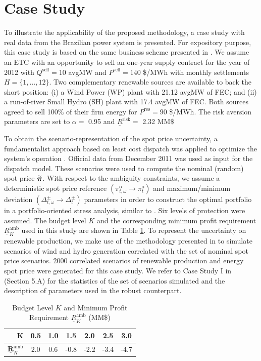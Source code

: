 \section{Case Study}
\label{CaseStudy}

	To illustrate the applicability of the proposed methodology, a case study with real data from the Brazilian power system is presented. For expository purpose, this case study is based on the same business scheme presented in \cite{RobustSpotPrice}. We assume an ETC with an opportunity to sell an one-year supply contract for the year of 2012 with $Q^{\text{sell}} = 10$ avgMW and $P^{\text{sell}} = 140$ \$/MWh with monthly settlements $H = \{1, \dots, 12\}$. Two complementary renewable sources are available to back the short position: (i) a Wind Power (WP) plant with 21.12 avgMW of FEC; and (ii) a run-of-river Small Hydro (SH) plant with 17.4 avgMW of FEC. Both sources agreed to sell 100\% of their firm energy for $P^{\text{res}} = 90$ \$/MWh. The risk aversion parameters are set to $\alpha = $ 0.95 and $\underline{R}^{\text{risk}} = $ 2.32 MM\$

	To obtain the scenario-representation of the spot price uncertainty, a fundamentalist approach based on least cost dispatch was applied to optimize the system's operation \cite{SDDPMathProg}. Official data from December 2011 was used as input for the dispatch model. These scenarios were used to compute the nominal (random) spot price $\accentset{\sim}{\boldsymbol{\pi}}$. With respect to the ambiguity constraints, we assume a deterministic spot price reference $(\pi^{\text{o}}_{t,\omega} \rightarrow \pi^{\text{o}}_{t})$ and maximum/minimum deviation $(\Delta^{\pm}_{t,\omega} \rightarrow \Delta^{\pm}_{t})$ parameters in order to construct the optimal portfolio in a portfolio-oriented stress analysis, similar to \cite{RobustSpotPrice}. Six levels of protection were assumed. The budget level $K$ and the corresponding minimum profit requirement $\underline{R}_{K}^{\text{amb}}$ used in this study are shown in Table \ref{AmbiguityConstraintsParam}. To represent the uncertainty on renewable production, we make use of the methodology presented in \cite{FosteringWPP} to simulate scenarios of wind and hydro generation correlated with the set of nominal spot price scenarios. 2000 correlated scenarios of renewable production and energy spot price were generated for this case study. We refer to Case Study I in \cite{RobustSpotPrice} (Section 5.A) for the statistics of the set of scenarios simulated and the description of parameters used in the robust counterpart.
%
\begin{table}
	\renewcommand{\arraystretch}{1.1}
	\centering
	\caption{Budget Level $K$ and Minimum Profit Requirement $\underline{R}_{K}^{\text{amb}}$ (MM\$)}
	\begin{tabular}{ r | c  c  c  c  c  c }
		$ \boldsymbol{K} $ & 0.5 & 1.0 & 1.5 & 2.0 & 2.5 & 3.0 \\
		\hline
		$ \underline{\boldsymbol{R}}_{K}^{\text{amb}}$ & 2.0 & 0.6 & -0.8 & -2.2 & -3.4 & -4.7
	\end{tabular}
	\label{AmbiguityConstraintsParam}
\end{table}

